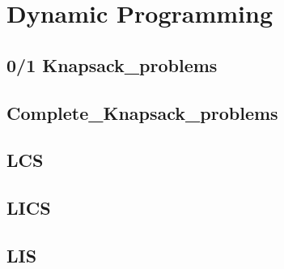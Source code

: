 \section{Dynamic Programming}
    \subsection{0/1 Knapsack\_problems}
        
    \subsection{Complete\_Knapsack\_problems}
        
    \subsection{LCS}
        
    \subsection{LICS}
        
    \subsection{LIS}
        